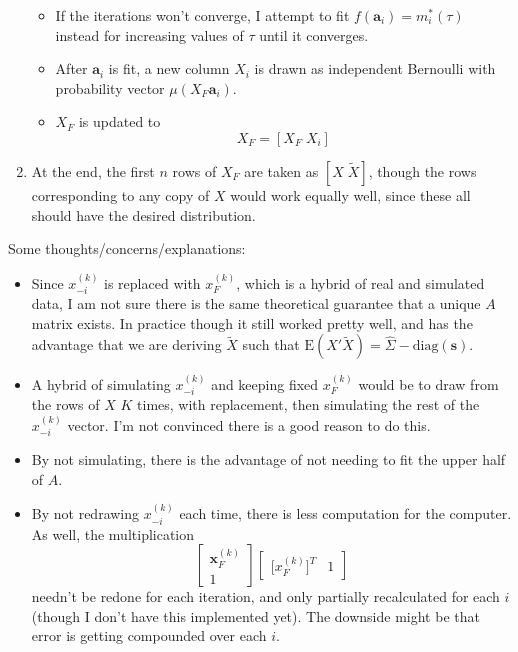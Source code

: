 \documentclass[11pt]{article}
\newcommand{\E}{\mathrm{E}}
\newcommand{\diag}{\mathrm{diag}}
\theoremstyle{definition}
\begin{document}
\begin{enumerate}
\begin{itemize}
                    \item If the iterations won't converge, I attempt to fit $f(\mathbf a_i)=m_i^*(\tau)$ instead for increasing values of $\tau$ until it converges.
                    \item After $\mathbf a_i$ is fit, a new column $X_i$ is drawn as independent Bernoulli with probability vector $\mu(X_F \mathbf a_i)$.   
                    \item $X_F$ is updated to 
                    \[ X_F = [X_F \; X_i] \]
                \end{itemize}
            \item At the end, the first $n$ rows of $X_F$ are taken as $[X \; \tilde X]$, though the rows corresponding to any copy of $X$ would work equally well, since these all should have the desired distribution.
        \end{enumerate}
        Some thoughts/concerns/explanations:
        \begin{itemize}
            \item Since $x_{-i}^{(k)}$ is replaced with $x_F^{(k)}$, which is a hybrid of real and simulated data, I am not sure there is the same theoretical guarantee that a unique $A$ matrix exists. In practice though it still worked pretty well, and has the advantage that we are deriving $\tilde X$ such that $\E(X'\tilde X) = \hat \Sigma- \diag(\mathbf s)$.
            \item A hybrid of simulating $x_{-i}^{(k)}$ and keeping fixed $x_F^{(k)}$ would be to draw from the rows of $X$ $K$ times, with replacement, then simulating the rest of the $x_{-i}^{(k)}$ vector. I'm not convinced there is a good reason to do this. 
            \item By not simulating, there is the advantage of not needing to fit the upper half of $A$.
            \item By not redrawing $x_{-i}^{(k)}$ each time, there is less computation for the computer. As well, the multiplication
                \[ \left[\begin{array}{c} \mathbf x_F^{(k)} \\ 1 \end{array}\right]\left[\begin{array}{cc} \mathbf [x_F^{(k)}]^T & 1 \end{array}\right] \]
            needn't be redone for each iteration, and only partially recalculated for each $i$ (though I don't have this implemented yet). The downside might be that error is getting compounded over each $i$.
        \end{itemize}
\end{document}

